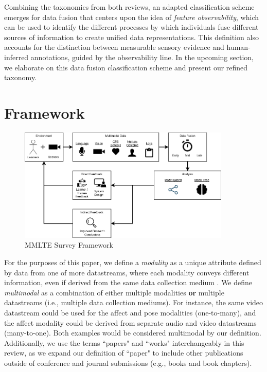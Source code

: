 \documentclass[manuscript,screen,review]{acmart}
\begin{document}
Combining the taxonomies from both reviews, an adapted classification scheme emerges for data fusion that centers upon the idea of \textit{feature observability}, which can be used to identify the different processes by which individuals fuse different sources of information to create unified data representations. This definition also accounts for the distinction between measurable sensory evidence and human-inferred annotations, guided by the observability line. In the upcoming section, we elaborate on this data fusion classification scheme and present our refined taxonomy.

\section{Framework} \label{sec:framework}


\begin{figure}[htbp]
    \centering
    \includegraphics[width=0.9\textwidth]{img/MMLTE_Framework.png}
    \caption{MMLTE Survey Framework}
    \label{fig:framework}
\end{figure}



For the purposes of this paper, we define a \textit{modality} as a unique attribute defined by data from one of more datastreams, where each modality conveys different information, even if derived from the same data collection medium \cite{ochoa2017multimodal}. We define \textit{multimodal} as a combination of either multiple modalities \textbf{or} multiple datastreams (i.e., multiple data collection mediums). For instance, the same video datastream could be used for the affect and pose modalities (one-to-many), and the affect modality could be derived from separate audio and video datastreams (many-to-one). Both examples would be considered multimodal by our definition. Additionally, we use the terms ``papers" and ``works" interchangeably in this review, as we expand our definition of ``paper" to include other publications outside of conference and journal submissions (e.g., books and book chapters).
 
\end{document}
